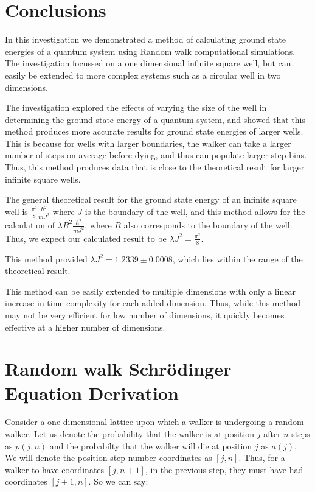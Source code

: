 \documentclass[journal]{IEEEtran}
\begin{document}
\section{Conclusions}

In this investigation we demonstrated a method of calculating ground state
energies of a quantum system using Random walk computational simulations. The
investigation focussed on a one dimensional infinite square well, but can easily
be extended to more complex systems such as a circular well in two dimensions.

The investigation explored the effects of varying the size of the well in
determining the ground state energy of a quantum system, and showed that this
method produces more accurate results for ground state energies of larger wells.
This is because for wells with larger boundaries, the walker can take a larger
number of steps on average before dying, and thus can populate larger step
bins. Thus, this method produces data that is close to the theoretical result
for larger infinite square wells.

The general theoretical result for the ground state energy of an infinite square
well is $\frac{\pi^2}{8}\frac{\hbar^2}{mJ^2}$ where $J$ is the boundary of the
well, and this method allows for the calculation of $\lambda R^2
\frac{\hbar^2}{mJ^2}$, where $R$ also corresponds to the boundary of the
well. Thus, we expect our calculated result to be $\lambda J^2 =
\frac{\pi^2}{8}$.

This method provided $\lambda J^2 = 1.2339 \pm 0.0008$, which lies within the
range of the theoretical result.

This method can be easily extended to multiple dimensions with only a linear
increase in time complexity for each added dimension. Thus, while this method
may not be very efficient for low number of dimensions, it quickly becomes
effective at a higher number of dimensions.


\pagebreak
\appendices
\section{Random walk Schr\"{o}dinger Equation Derivation}
\label{appendix:derivation}
Consider a one-dimensional lattice upon which a walker is undergoing a random
walker. Let us denote the probability that the walker is at position $j$ after
$n$ steps as $p(j,n)$ and the probabilty that the walker will die at position
$j$ as $a(j)$. We will denote the position-step number coordinates as $[j,
n]$. Thus, for a walker to have coordinates $[j, n+1]$, in the previous step,
they must have had coordinates $[j \pm 1, n]$. So we can say:
\end{document}
